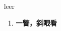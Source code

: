 
\begin{frame}
{\huge leer}
\begin{center}
\begin{enumerate}\Large
  \item \textbf{一瞥，斜眼看}
\end{enumerate}
\end{center}
\end{frame}
